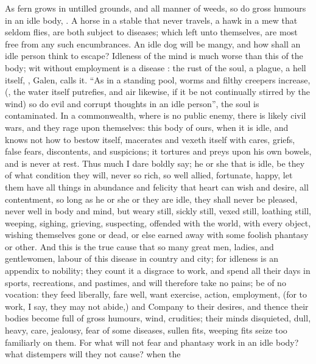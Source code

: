 As fern grows in untilled grounds, and all manner of weeds, so do gross humours
in an idle body, . A horse in a stable that
never travels, a hawk in a mew that seldom flies, are both subject to diseases;
which left unto themselves, are most free from any such encumbrances. An idle
dog will be mangy, and how shall an idle person think to escape? Idleness of
the mind is much worse than this of the body; wit without employment is a
disease : the rust of the
soul, a plague, a hell itself, , Galen, calls it. \enquote{As in a standing pool,
worms and filthy creepers increase, (,
the water itself putrefies, and air likewise, if it be not continually stirred
by the wind) so do evil and corrupt thoughts in an idle person}, the soul is
contaminated. In a commonwealth, where is no public enemy, there is likely
civil wars, and they rage upon themselves: this body of ours, when it is idle,
and knows not how to bestow itself, macerates and vexeth itself with cares,
griefs, false fears, discontents, and suspicions; it tortures and preys upon
his own bowels, and is never at rest. Thus much I dare boldly say; he or she
that is idle, be they of what condition they will, never so rich, so well
allied, fortunate, happy, let them have all things in abundance and felicity
that heart can wish and desire, all contentment, so long as he or she or they
are idle, they shall never be pleased, never well in body and mind, but weary
still, sickly still, vexed still, loathing still, weeping, sighing, grieving,
suspecting, offended with the world, with every object, wishing themselves gone
or dead, or else earned away with some foolish phantasy or other. And this is
the true cause that so many great men, ladies, and gentlewomen, labour of this
disease in country and city; for idleness is an appendix to nobility; they
count it a disgrace to work, and spend all their days in sports, recreations,
and pastimes, and will therefore take no pains; be of no vocation: they feed
liberally, fare well, want exercise, action, employment, (for to work, I say,
they may not abide,) and Company to their desires, and thence their bodies
become full of gross humours, wind, crudities; their minds disquieted, dull,
heavy, \etc{} care, jealousy, fear of some diseases, sullen fits, weeping fits
seize too familiarly on them. For what will not fear and
phantasy work in an idle body? what distempers will they not cause? when the

